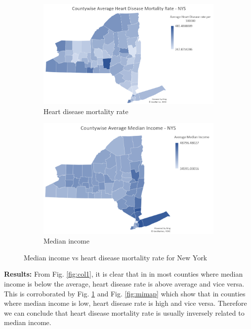 \documentclass[journal,12pt,onecolumn]{IEEEtran}
\begin{document}
\begin{figure}[H]
  \centering
  \begin{subfigure}{.5\textwidth}
  \centering
  \includegraphics[width=\linewidth]{figures/map_heart.PNG}
  \caption{Heart disease mortality rate}
  \label{fig:hdmap}
\end{subfigure}%
\begin{subfigure}{.48\textwidth}
  \centering
  \includegraphics[width=\linewidth]{figures/map_income.PNG}
  \caption{Median income}
  \label{fig:hdheatmap}
\end{subfigure}
\caption{Median income vs heart disease mortality rate for New York}
\label{}
\end{figure}



\textbf{Results:}
From Fig. \ref{fig:col1}, it is clear that in in most counties where median income is below the average, heart disease rate is above average and vice versa.
This is corroborated by Fig. \ref{fig:hdmap} and Fig. \ref{fig:mimap} which show that in counties where median income is low, heart disease rate is high and vice versa.
Therefore we can conclude that heart disease mortality rate is usually inversely related to median income.   
\newpage
\end{document}

